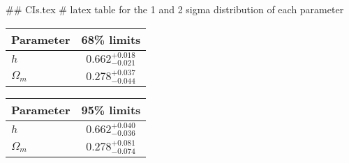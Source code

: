 ## CIs.tex
# latex table for the 1 and 2 sigma distribution of each parameter

\begin{tabular} { l  c}
 Parameter &  68\% limits\\
\hline
{\boldmath$h              $} & $0.662^{+0.018}_{-0.021}   $\\
{\boldmath$\Omega_m       $} & $0.278^{+0.037}_{-0.044}   $\\
\hline
\end{tabular}

\begin{tabular} { l  c}
 Parameter &  95\% limits\\
\hline
{\boldmath$h              $} & $0.662^{+0.040}_{-0.036}   $\\
{\boldmath$\Omega_m       $} & $0.278^{+0.081}_{-0.074}   $\\
\hline
\end{tabular}
